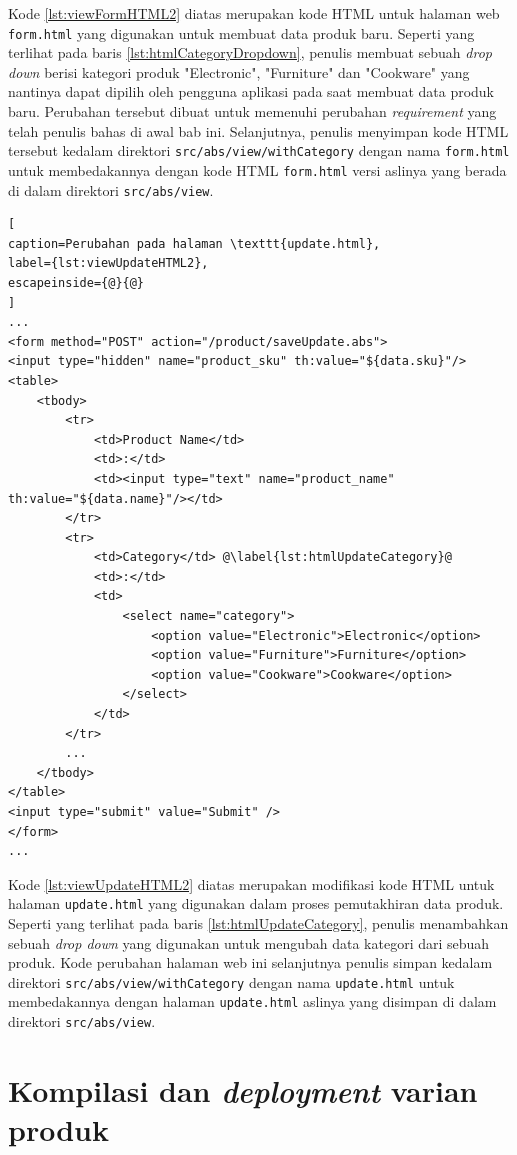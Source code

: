 Kode \ref{lst:viewFormHTML2} diatas merupakan kode HTML untuk halaman web \texttt{form.html} yang digunakan untuk membuat data produk baru. Seperti yang terlihat pada baris \ref{lst:htmlCategoryDropdown}, penulis membuat sebuah \textit{drop down} berisi kategori produk "Electronic", "Furniture" dan "Cookware" yang nantinya dapat dipilih oleh pengguna aplikasi pada saat membuat data produk baru. Perubahan tersebut dibuat untuk memenuhi perubahan \textit{requirement} yang telah penulis bahas di awal bab ini. Selanjutnya, penulis menyimpan kode HTML tersebut kedalam direktori \texttt{src/abs/view/withCategory} dengan nama \texttt{form.html} untuk membedakannya dengan kode HTML \texttt{form.html} versi aslinya yang berada di dalam direktori \texttt{src/abs/view}.

\begin{lstlisting}[
caption=Perubahan pada halaman \texttt{update.html},
label={lst:viewUpdateHTML2},
escapeinside={@}{@}
]
...
<form method="POST" action="/product/saveUpdate.abs">
<input type="hidden" name="product_sku" th:value="${data.sku}"/>
<table>
	<tbody>
		<tr>
			<td>Product Name</td>
			<td>:</td>
			<td><input type="text" name="product_name" th:value="${data.name}"/></td>
		</tr>
		<tr>
			<td>Category</td> @\label{lst:htmlUpdateCategory}@
			<td>:</td>
			<td>
				<select name="category">
					<option value="Electronic">Electronic</option>
					<option value="Furniture">Furniture</option>
					<option value="Cookware">Cookware</option>
				</select>
			</td>
		</tr>
        ...
	</tbody>
</table>
<input type="submit" value="Submit" />
</form> 
... 
\end{lstlisting}

Kode \ref{lst:viewUpdateHTML2} diatas merupakan modifikasi kode HTML untuk halaman \texttt{update.html} yang digunakan dalam proses pemutakhiran data produk. Seperti yang terlihat pada baris \ref{lst:htmlUpdateCategory}, penulis menambahkan sebuah \textit{drop down} yang digunakan untuk mengubah data kategori dari sebuah produk. Kode perubahan halaman web ini selanjutnya penulis simpan kedalam direktori \texttt{src/abs/view/withCategory} dengan nama \texttt{update.html} untuk membedakannya dengan halaman \texttt{update.html} aslinya yang disimpan di dalam direktori \texttt{src/abs/view}.

\section{Kompilasi dan \textit{deployment} varian produk}

